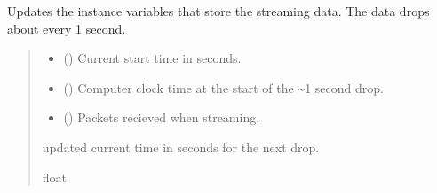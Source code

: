 \documentclass[letterpaper,10pt,english]{sphinxmanual}
\begin{document}
\begin{fulllineitems}
\begin{fulllineitems}
\label{\detokenize{PodApi.Stream.Collect:PodApi.Stream.Collect.DataHose.Hose._Drop}}
\pysigstartsignatures
{}
\pysigstopsignatures
\sphinxAtStartPar
Updates the instance variables that store the streaming data.         The data drops about every 1 second.
\begin{quote}\begin{description}
\begin{itemize}
\item {} 
\sphinxAtStartPar
{} () \textendash{} Current start time in seconds.

\item {} 
\sphinxAtStartPar
{} () \textendash{} Computer clock time at the start of the \textasciitilde{}1 second drop.

\item {} 
\sphinxAtStartPar
{} (\sphinxstyleliteralemphasis{\sphinxupquote{{[}}}{\hyperref[\detokenize{PodApi.Packets:PodApi.Packets.Packet.Packet}]{\sphinxcrossref{\sphinxstyleliteralemphasis{\sphinxupquote{Packet}}}}}\sphinxstyleliteralemphasis{\sphinxupquote{ | }}\sphinxstyleliteralemphasis{\sphinxupquote{{]}}}) \textendash{} Packets recieved when streaming.

\end{itemize}

\sphinxAtStartPar
updated current time in seconds for the next drop.

\sphinxAtStartPar
float

\end{description}\end{quote}


\end{fulllineitems}
\end{fulllineitems}
\end{document}
